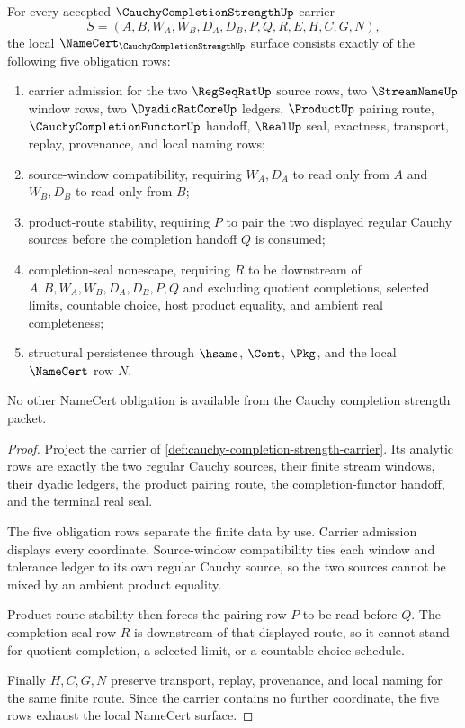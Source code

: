 \begin{theorem}
\label{thm:cauchy-completion-strength-namecert-obligations}
For every accepted $\CauchyCompletionStrengthUp$ carrier
$$
S=(A,B,W_A,W_B,D_A,D_B,P,Q,R,E,H,C,G,N),
$$
the local $\NameCert_{\CauchyCompletionStrengthUp}$ surface consists exactly of the following five obligation rows:
\begin{enumerate}
\item carrier admission for the two $\RegSeqRatUp$ source rows, two $\StreamNameUp$ window rows, two $\DyadicRatCoreUp$ ledgers, $\ProductUp$ pairing route, $\CauchyCompletionFunctorUp$ handoff, $\RealUp$ seal, exactness, transport, replay, provenance, and local naming rows;
\item source-window compatibility, requiring $W_A,D_A$ to read only from $A$ and $W_B,D_B$ to read only from $B$;
\item product-route stability, requiring $P$ to pair the two displayed regular Cauchy sources before the completion handoff $Q$ is consumed;
\item completion-seal nonescape, requiring $R$ to be downstream of $A,B,W_A,W_B,D_A,D_B,P,Q$ and excluding quotient completions, selected limits, countable choice, host product equality, and ambient real completeness;
\item structural persistence through $\hsame$, $\Cont$, $\Pkg$, and the local $\NameCert$ row $N$.
\end{enumerate}
No other NameCert obligation is available from the Cauchy completion strength packet.
\end{theorem}
\begin{proof}
Project the carrier of \autoref{def:cauchy-completion-strength-carrier}. Its analytic rows are exactly the two regular Cauchy sources, their finite stream windows, their dyadic ledgers, the product pairing route, the completion-functor handoff, and the terminal real seal.

The five obligation rows separate the finite data by use. Carrier admission displays every coordinate. Source-window compatibility ties each window and tolerance ledger to its own regular Cauchy source, so the two sources cannot be mixed by an ambient product equality.

Product-route stability then forces the pairing row $P$ to be read before $Q$. The completion-seal row $R$ is downstream of that displayed route, so it cannot stand for quotient completion, a selected limit, or a countable-choice schedule.

Finally $H,C,G,N$ preserve transport, replay, provenance, and local naming for the same finite route. Since the carrier contains no further coordinate, the five rows exhaust the local NameCert surface.
\end{proof}

